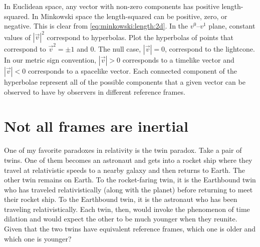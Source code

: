 \documentclass[12pt, oneside]{report}    %
\let\oldsection\section
\def\section{%
  \setcounter{sidenote}{1}%
  \oldsection
}
\begin{document}
\begin{exercise}
In Euclidean space, any vector with non-zero components has positive length-squared. In Minkowski space the length-squared can be positive, zero, or negative. This is clear from \eqref{eq:minkowski:length:2d}. In the $v^0$--$v^1$ plane, constant values of $|\vec{v}|^2$ correspond to hyperbolas. Plot the hyperbolas of points that correspond to $\vec{v}^2 = \pm 1$ and $0$. The null case, $|\vec{v}|=0$, correspond to the lightcone. In our metric sign convention, $|\vec{v}|>0$ corresponds to a timelike vector and $|\vec{v}|<0$ corresponds to a spacelike vector. Each connected component of the hyperbolae represent all of the possible components that a given vector can be observed to have by observers in different reference frames.
\end{exercise}


\section{Not all frames are inertial}

One of my favorite paradoxes in relativity is the twin paradox. Take a pair of twins. One of them becomes an astronaut and gets into a rocket ship where they travel at relativistic speeds to a nearby galaxy and then returns to Earth. The other twin remains on Earth. To the rocket-faring twin, it is the Earthbound twin who has traveled relativistically (along with the planet) before returning to meet their rocket ship. To the Earthbound twin, it is the astronaut who has been traveling relativistically. Each twin, then, would invoke the phenomenon of time dilation and would expect the other to be much younger when they reunite. Given that the two twins have equivalent reference frames, which one is older and which one is younger? 
\end{document}
